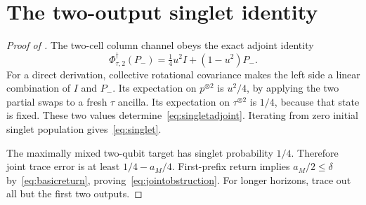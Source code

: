 \section{The two-output singlet identity}\label{app:singlet}
\begin{proof}[Proof of ]
The two-cell column channel obeys the exact adjoint identity
\begin{equation}
 \Phi_{\tau,2}^{\dagger}(P_-)=\tfrac14u^2 I+(1-u^2)P_-.
 \label{eq:singletadjoint}
\end{equation}
For a direct derivation, collective rotational covariance makes the left side a linear combination of $I$ and $P_-$. Its expectation on $p^{\otimes2}$ is $u^2/4$, by applying the two partial swaps to a fresh $\tau$ ancilla. Its expectation on $\tau^{\otimes2}$ is $1/4$, because that state is fixed. These two values determine~\eqref{eq:singletadjoint}. Iterating from zero initial singlet population gives~\eqref{eq:singlet}.

The maximally mixed two-qubit target has singlet probability $1/4$. Therefore joint trace error is at least $1/4-a_M/4$. First-prefix return implies $a_M/2\le\delta$ by~\eqref{eq:basicreturn}, proving~\eqref{eq:jointobstruction}. For longer horizons, trace out all but the first two outputs.
\end{proof}
